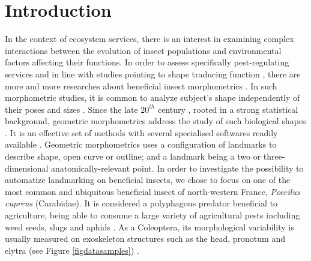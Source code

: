 \documentclass[review]{elsarticle}
\begin{document}
\section{Introduction}
\label{intro}
In the context of ecosystem services, there is an interest in examining complex interactions between the evolution of insect populations and environmental factors affecting their functions. In order to assess specifically pest-regulating services and in line with studies pointing to shape traducing function \cite{klingenberg_evolution_2010}, there are more and more researches about beneficial insect morphometrics \cite{sasakawa_utility_2016,raymond_combination_2014}. 
 In such morphometric studies, it is common to analyze subject's shape independently of their poses and sizes \cite{kendall_diffusion_1977}. Since the late $20^{th}$ century \cite{bookstein_foundations_1982}, rooted in a strong statistical background, geometric morphometrics address the study of such biological shapes \cite{rohlf_applications_1998}. It is an effective set of methods with several specialised softwares readily available \cite{adams_geomorph:_2013,klingenberg_morphoj:_2011}. Geometric morphometrics uses a configuration of landmarks to describe shape, open curve or outline; and a landmark being a two or three-dimensional anatomically-relevant point. In order to investigate the possibility to automatize landmarking on beneficial insects, we chose to focus on one of the most common and ubiquitous beneficial insect of north-western France, \textit{Poecilus cupreus} (Carabidae). It is considered a polyphagous predator \cite{larochelle_1990} beneficial to agriculture, being able to consume a large variety of agricultural pests including weed seeds, slugs and aphids \cite{kromp_carabid_1999}. As a Coleoptera, its morphological variability is usually measured on exoskeleton structures such as the head, pronotum and elytra (see Figure \ref{figdatasamples}) \cite{eldred_does_2016}. 
 
\end{document}
